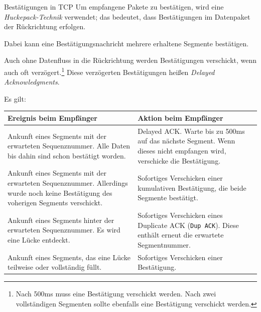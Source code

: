 \begin{defi}{Bestätigungen in TCP}
    Um empfangene Pakete zu bestätigen, wird eine \emph{Huckepack-Technik} verwendet; das bedeutet, dass Bestätigungen im Datenpaket der Rückrichtung erfolgen.

    Dabei kann eine Bestätigungsnachricht mehrere erhaltene Segmente bestätigen.

    Auch ohne Datenfluss in die Rückrichtung werden Bestätigungen verschickt, wenn auch oft verzögert.\footnote{Nach 500ms muss eine Bestätigung verschickt werden. Nach zwei vollständigen Segmenten sollte ebenfalls eine Bestätigung verschickt werden.}
    Diese verzögerten Bestätigungen heißen \emph{Delayed Acknowledgments}.

    Es gilt:

    \begin{tabularx}{\textwidth}{|X|X|}
        \hline
        Ereignis beim Empfänger                                                                                                             & Aktion beim Empfänger                                                                                                  \\
        \hline
        \hline
        Ankunft eines Segments mit der erwarteten Sequenznummer. Alle Daten bis dahin sind schon bestätigt worden.                          & Delayed ACK. Warte bis zu 500ms auf das nächste Segment. Wenn dieses nicht empfangen wird, verschicke die Bestätigung. \\
        \hline
        Ankunft eines Segments mit der erwarteten Sequenznummer. Allerdings wurde noch keine Bestätigung des voherigen Segments verschickt. & Sofortiges Verschicken einer kumulativen Bestätigung, die beide Segmente bestätigt.                                    \\
        \hline
        Ankunft eines Segments hinter der erwarteten Sequenznummer. Es wird eine Lücke entdeckt.                                            & Sofortiges Verschicken eines Duplicate ACK (\texttt{Dup ACK}). Diese enthält erneut die erwartete Segmentnummer.       \\
        \hline
        Ankunft eines Segments, das eine Lücke teilweise oder vollständig füllt.                                                            & Sofortiges Verschicken einer Bestätigung.                                                                              \\
        \hline
    \end{tabularx}
\end{defi}

